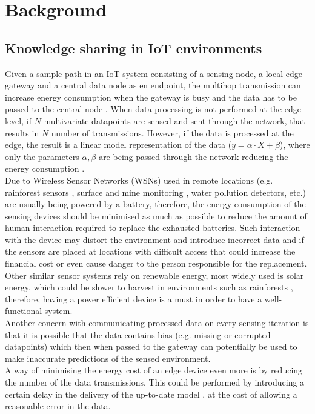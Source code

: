 \documentclass{mpaper}
\begin{document}
\section{Background}
\subsection*{Knowledge sharing in IoT environments}
Given a sample path in an IoT system consisting of a sensing node, a local edge gateway and a central data node as en endpoint, the multihop transmission can increase energy consumption when the gateway is busy and the data has to be passed to the central node \cite{shi2016}. When data processing is not performed at the edge level, if $N$ multivariate datapoints are sensed and sent through the network, that results in $N$ number of transmissions. However, if the data is processed at the edge, the result is a linear model representation of the data ($y = \alpha\cdot X + \beta$), where only the parameters $\alpha, \beta$ are being passed through the network reducing the energy consumption \cite{tanluizhang2011}.\\
Due to Wireless Sensor Networks (WSNs) used in remote locations (e.g. rainforest sensors  \cite{rainforests2009}, surface and mine monitoring \cite{Akkas2018}, water pollution detectors\cite{waterwsn2017}, etc.) are usually being powered by a battery, therefore, the energy consumption of the sensing devices should be minimised as much as possible to reduce the amount of human interaction required to replace the exhausted batteries. Such interaction with the device may distort the environment and introduce incorrect data and if the sensors are placed at locations with difficult access that could increase the financial cost or even cause danger to the person responsible for the replacement.\\
Other similar sensor systems rely on renewable energy, most widely used is solar energy, which could be slower to harvest in environments such as rainforests \cite{rainforests2009}, therefore, having a power efficient device is a must in order to have a well-functional system.\\
Another concern with communicating processed data on every sensing iteration is that it is possible that the data contains bias (e.g. missing or corrupted datapoints) \cite{anagnostop2016} which then when passed to the gateway can potentially be used to make inaccurate predictions of the sensed environment.\\
A way of minimising the energy cost of an edge device even more is by reducing the number of the data transmissions. This could be performed by introducing a certain delay in the delivery of the up-to-date model \citep{anagnostop2014, anagnostop2016, anagnostopkolomvatos2016}, at the cost of allowing a reasonable error in the data. 
\end{document}
